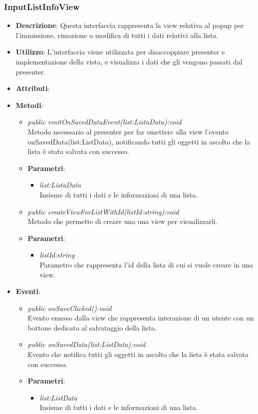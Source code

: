 \subsubsection{InputListInfoView}
\begin{itemize}
\item \textbf{Descrizione}: Questa interfaccia rappresenta la view relativa al popup per l'immissione, rimozione o modifica di tutti i dati relativi alla lista.
\item \textbf{Utilizzo}: L'interfaccia viene utilizzata per disaccoppiare presenter e implementazione della vista, e visualizza i dati che gli vengono passati dal presenter.
\item \textbf{Attributi}: 
\item \textbf{Metodi}:
	\begin{itemize}	
	\item \textit{public emitOnSavedDataEvent(list:ListaData):void}\\
	Metodo necessario al presenter per far emettere alla view l'evento onSavedData(list:ListData), notificando tutti gli oggetti in ascolto che la lista è stata salvata con successo.
			\item{\textbf{Parametri}: \begin{itemize}
			\item \textit{list:ListaData}\\
			Insieme di tutti i dati e le informazioni di una lista.
			\end{itemize}}
	\item \textit{public createViewForListWithId(listId:string):void}\\
	Metodo che permette di creare una una view per visualizzarli.
			\item{\textbf{Parametri}: \begin{itemize}
			\item \textit{listId:string}\\
			Parametro che rappresenta l'id della lista di cui si vuole creare in una view.
			\end{itemize}}
	\end{itemize}
\item \textbf{Eventi}:
	\begin{itemize}
	\item \textit{public onSaveClicked():void}\\
	Evento emesso dalla view che rappresenta interazione di un utente con un bottone dedicato al salvataggio della lista.
	\item \textit{public onSavedData(list:ListData):void}\\
			Evento che notifica tutti gli oggetti in ascolto che la lista è stata salvata con successo.
			\item{\textbf{Parametri}: \begin{itemize}
			\item \textit{list:ListData}\\
			Insieme di tutti i dati e le informazioni di una lista.
			\end{itemize}}
	\end{itemize}
\end{itemize}


